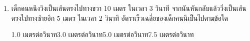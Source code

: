 \begin{enumerate}
	\item \runningj  \nonet เด็กคนหนึงวิงเป็นเส้นตรงไปทางขวา 10 เมตร ในเวลา 3 วินาที จากนันหันกลับแล้ววิ่งเป็นเส้นตรงไปทางซ้ายอีก 5 เมตร ในเวลา 2 วินาที อัตราเร็วเฉลี่ยของเด็กคนนีเป็นไปตามข้อใด 
	\begin{2c}
		{1.0 เมตรต่อวินาท}{3.0 เมตรต่อวินาท}{5.0 เมตรต่อวินาท}{7.5 เมตรต่อวินาท}
	\end{2c}
\end{enumerate}
